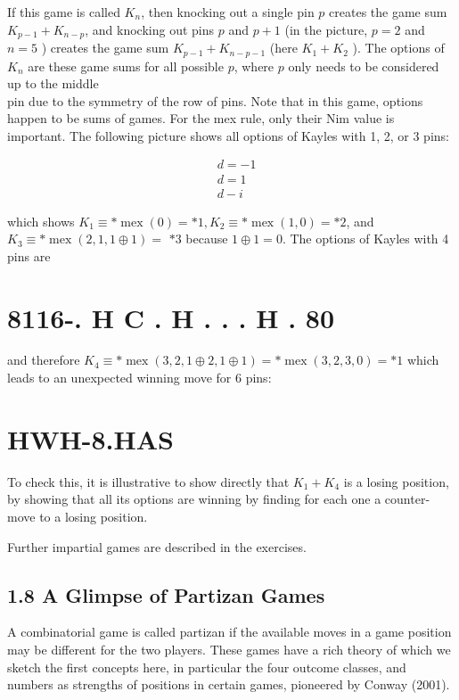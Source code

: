 \documentclass[12pt]{article}
\begin{document}
If this game is called $K_{n}$, then knocking out a single pin $p$ creates the game sum $K_{p-1}+K_{n-p}$, and knocking out pins $p$ and $p+1$ (in the picture, $p=2$ and $n=5$ ) creates the game sum $K_{p-1}+K_{n-p-1}$ (here $K_{1}+K_{2}$ ). The options of $K_{n}$ are these game sums for all possible $p$, where $p$ only needs to be considered up to the middle\\
pin due to the symmetry of the row of pins. Note that in this game, options happen to be sums of games. For the mex rule, only their Nim value is important. The following picture shows all options of Kayles with 1, 2, or 3 pins:

$$
\begin{aligned}
& d=-1 \\
& d=1 \\
& d-i
\end{aligned}
$$

which shows $K_{1} \equiv * \operatorname{mex}(0)=* 1, K_{2} \equiv * \operatorname{mex}(1,0)=* 2$, and $K_{3} \equiv * \operatorname{mex}(2,1,1 \oplus 1)=$ $* 3$ because $1 \oplus 1=0$. The options of Kayles with 4 pins are

\section*{8116-. H C . H . . . H . 80}
and therefore $K_{4} \equiv * \operatorname{mex}(3,2,1 \oplus 2,1 \oplus 1)=* \operatorname{mex}(3,2,3,0)=* 1$ which leads to an unexpected winning move for 6 pins:

\section*{HWH-8.HAS}
To check this, it is illustrative to show directly that $K_{1}+K_{4}$ is a losing position, by showing that all its options are winning by finding for each one a counter-move to a losing position.

Further impartial games are described in the exercises.

\subsection*{1.8 A Glimpse of Partizan Games}
A combinatorial game is called partizan if the available moves in a game position may be different for the two players. These games have a rich theory of which we sketch the first concepts here, in particular the four outcome classes, and numbers as strengths of positions in certain games, pioneered by Conway (2001).
\end{document}

